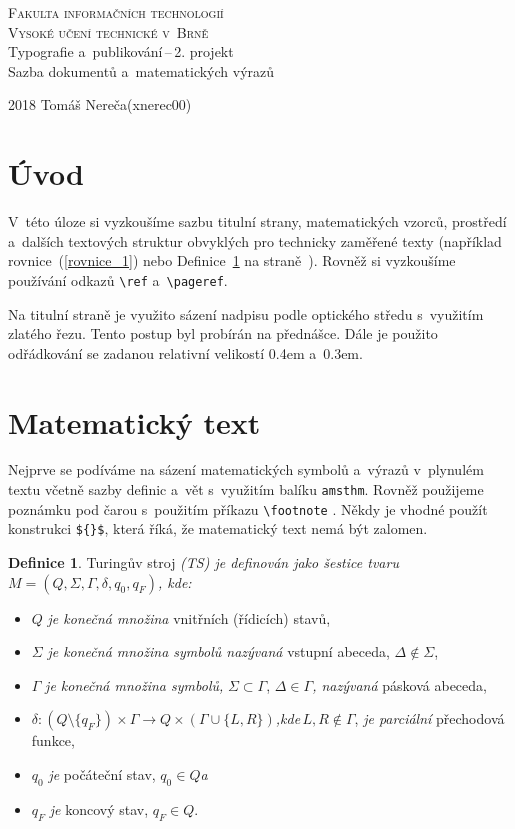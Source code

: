 \documentclass[a4paper, 11pt, twocolumn]{article}
\theoremstyle{definition}
\newtheorem{definition}{Definice}
\theoremstyle{definition}
\begin{document}
\begin{titlepage}
\begin{center}
	
	\textsc{\Huge Fakulta informačních technologií\\[3.5mm]
			Vysoké učení technické v~Brně}
	\\[79mm]
	{\LARGE Typografie a~publikování\,--\,2. projekt\\[1.5mm]
	Sazba dokumentů a~matematických výrazů}
	\vfill
\end{center}
{\Large 2018 \hfill Tomáš Nereča(xnerec00)}
\\[-4mm]
\end{titlepage}

\section*{Úvod}
V~této úloze si vyzkoušíme sazbu titulní strany, matematických vzorců, prostředí a~dalších textových struktur obvyklých pro technicky zaměřené texty (například rovnice~(\ref{rovnice_1}) nebo Definice~\ref{definice_1} na straně~\pageref{definice_1}). Rovněž si vyzkoušíme používání odkazů \verb|\ref| a~\verb|\pageref|.

Na titulní straně je využito sázení nadpisu podle optického středu s~využitím zlatého řezu. Tento postup byl probírán na přednášce. Dále je použito odřádkování se
zadanou relativní velikostí 0.4em a~0.3em.

\section{Matematický text}
Nejprve se podíváme na sázení matematických symbolů a~výrazů v~plynulém textu včetně sazby definic a~vět s~využitím balíku \verb|amsthm|. Rovněž použijeme poznámku pod čarou s~použitím příkazu \verb|\footnote| . Někdy je vhodné použít konstrukci \verb|${}$|, která říká, že matematický text nemá být zalomen.

\begin{definition} \label{definice_1}
Turingův stroj \emph{(TS) je definován jako šestice tvaru $M=(Q,\Sigma,\Gamma,\delta, q_0, q_F)$, kde:}

\begin{itemize}
\item $Q$ \emph{je konečná množina} vnitřních (řídicích) stavů,
\item $\Sigma$ \emph{je konečná množina symbolů nazývaná} vstupní abeceda, $\Delta \not\in \Sigma$,
\item $\Gamma$ \emph{je konečná množina symbolů,} $\Sigma\subset \Gamma$, $\Delta\in\Gamma$\emph{, nazývaná} pásková abeceda,
\item $\delta:(Q\setminus\{q_F\})\times\Gamma\rightarrow Q\times(\Gamma\cup\{L,R\})$\emph{,kde}\,$L,R\not\in\Gamma$, \emph{je parciální} přechodová funkce,
\item $q_0$ \emph{je} počáteční stav, $q_0\in Q$\:\emph{a}
\item $q_F$ \emph{je} koncový stav, $q_F\in Q$.
\end{itemize}
\end{definition}
\end{document}
